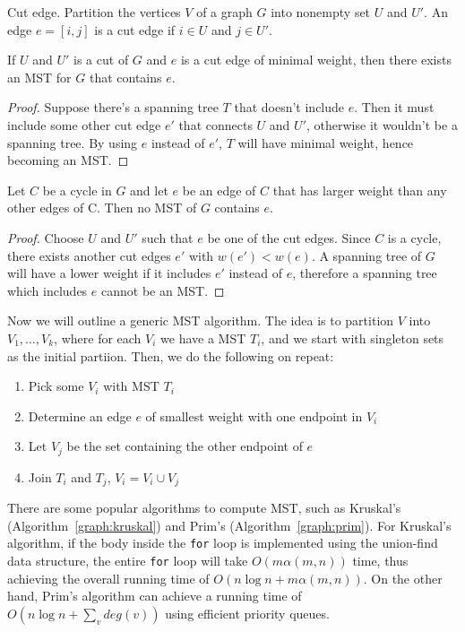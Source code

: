 \begin{definition}{Cut edge.}
  Partition the vertices $V$ of a graph $G$ into nonempty set $U$ and $U'$.  An
  edge $e=[i,j]$ is a cut edge if $i\in U$ and $j\in U'$.
\end{definition}
\begin{lemma}
  If $U$ and $U'$ is a cut of $G$ and $e$ is a cut edge of minimal weight, then
  there exists an MST for $G$ that contains $e$.
\end{lemma}
\begin{proof}
  Suppose there's a spanning tree $T$ that doesn't include $e$.  Then it must
  include some other cut edge $e'$ that connects $U$ and $U'$, otherwise it
  wouldn't be a spanning tree.  By using $e$ instead of $e'$, $T$ will have
  minimal weight, hence becoming an MST.
\end{proof}
\begin{lemma}
  Let $C$ be a cycle in $G$ and let $e$ be an edge of $C$ that has larger
  weight than any other edges of C.  Then no MST of $G$ contains $e$.
\end{lemma}
\begin{proof}
  Choose $U$ and $U'$ such that $e$ be one of the cut edges.  Since $C$ is
  a cycle, there exists another cut edges $e'$ with $w(e')<w(e)$.
  A spanning tree of $G$ will have a lower weight if it includes $e'$ instead
  of $e$, therefore a spanning tree which includes $e$ cannot be an MST.
\end{proof}

Now we will outline a generic MST algorithm.  The idea is to partition $V$ into
$V_1,\ldots,V_k$, where for each $V_i$ we have a MST $T_i$, and we start with
singleton sets as the initial partiion.  Then, we do the following on repeat:
\begin{enumerate}
  \item Pick some $V_i$ with MST $T_i$
	\item Determine an edge $e$ of smallest weight with one endpoint in $V_i$
	\item Let $V_j$ be the set containing the other endpoint of $e$
	\item Join $T_i$ and $T_j$, $V_i=V_i\cup V_j$
\end{enumerate}
There are some popular algorithms to compute MST, such as Kruskal's
(Algorithm~\ref{graph:kruskal}) and Prim's (Algorithm~\ref{graph:prim}).  For
Kruskal's algorithm, if the body inside the \texttt{for} loop is implemented
using the union-find data structure, the entire \texttt{for} loop will take
$O(m\alpha(m,n))$ time, thus achieving the overall running time of $O(n\log
n+m\alpha(m,n))$.  On the other hand, Prim's algorithm can achieve a running
time of $O(n\log n+\sum_v deg(v))$ using efficient priority queues.

